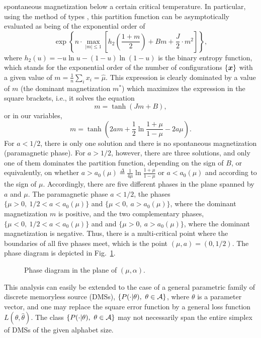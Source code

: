 \documentclass[11pt,epsf]{article}
\newcommand {\dfn} {\stackrel{\Delta} {=}}
\newcommand{\ct}{\hat{\theta}}
\newcommand {\bx} {\mbox{\boldmath $x$}}
\newcommand{\calA}{{\cal A}}
\begin{document}
spontaneous magnetization below a certain critical temperature. In particular,
using the method of types \cite{CK81}, this partition function can be
asymptotically evaluated
as being of the exponential order of
\begin{equation}
\exp\left\{n\cdot\max_{|m|\le
1}\left[h_2\left(\frac{1+m}{2}\right)+Bm+\frac{J}{2}\cdot
m^2\right]\right\},
\end{equation}
where $h_2(u)=-u\ln u-(1-u)\ln(1-u)$ is the binary entropy function, which stands for the
exponential order of the number of configurations $\{\bx\}$ with a given
value of $m=\frac{1}{n}\sum_ix_i=\hat{\mu}$. This expression
is clearly dominated by a
value of $m$ (the dominant magnetization $m^*$)
which maximizes the expression in the square brackets, i.e., it solves the
equation
\begin{equation}
m=\tanh(Jm+B),
\end{equation}
or in our variables,
\begin{equation}
m=\tanh\left(2a m+\frac{1}{2}\ln\frac{1+\mu}{1-\mu}-2a\mu\right).
\end{equation}
For $a < 1/2$, there is only one solution and there is no spontaneous
magnetization (paramagnetic phase). For $a > 1/2$, however, there are
three solutions, and only one of them dominates the partition function,
depending on the sign of $B$, or equivalently, on whether $a >
a_0(\mu)\dfn\frac{1}{4\mu}\ln\frac{1+\mu}{1-\mu}$ or $a <
a_0(\mu)$ and according to the sign of $\mu$. Accordingly, there are five
different phases in the plane spanned by $a$ and $\mu$. The paramagnetic
phase $a < 1/2$, the phases $\{\mu > 0,~1/2 < a < a_0(\mu)\}$
and $\{\mu < 0,~ a > a_0(\mu)\}$, where the dominant magnetization
$m$ is positive, and the two complementary phases,
$\{\mu < 0,~1/2 < a < a_0(\mu)\}$ and
and $\{\mu > 0,~ a > a_0(\mu)\}$, where the dominant magnetization
is negative. Thus, there is a multi-critical point
where the boundaries of all five phases meet,
which is the point $(\mu,a)=(0,1/2)$. The phase diagram is depicted in Fig.\
\ref{mm1}.

\begin{figure}[ht]
\hspace*{3cm}
\caption{\small Phase diagram in the plane of $(\mu,\alpha)$.}
\label{mm1}
\end{figure}

This analysis can easily be extended to the
case of a
general parametric family of discrete memoryless source (DMSs),
$\{P(\cdot|\theta),~\theta\in\calA\}$, where
$\theta$ is a parameter vector, and one may replace the square error function
by a general loss function $L(\theta,\ct)$. The class
$\{P(\cdot|\theta),~\theta\in\calA\}$ may not necessarily span the entire simplex of
DMSs of the given alphabet size. 
\end{document}
